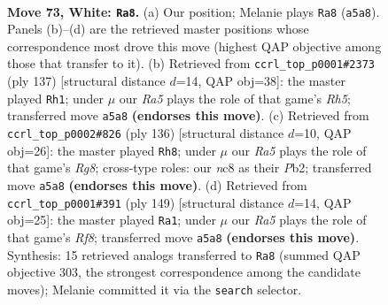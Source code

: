 \documentclass[11pt]{article}
\begin{document}
\clearpage

\begin{figure}[p]\centering
\begin{subfigure}{0.46\textwidth}\centering
\resizebox{\linewidth}{!}{%
\newchessgame
\chessboard[
  setfen={2nk4/8/8/R7/p6r/P6p/7K/8 w - - 4 73},
  showmover=false,
  pgfstyle=straightmove, color=movearrow, markmove={a5-a8}
]}
\caption{}
\end{subfigure}\hfill
\begin{subfigure}{0.46\textwidth}\centering
\resizebox{\linewidth}{!}{%
\newchessgame
\chessboard[
  setfen={8/8/4k3/4P1RP/7r/5K2/8/8 b - - 4 69},
  showmover=false,
  pgfstyle=straightmove, color=movearrow, markmove={h4-h1}
]}
\caption{}
\end{subfigure}
\\[4pt]
\begin{subfigure}{0.46\textwidth}\centering
\resizebox{\linewidth}{!}{%
\newchessgame
\chessboard[
  setfen={6R1/3k4/8/1p3rp1/1K6/7P/1P6/8 w - - 4 69},
  showmover=false,
  pgfstyle=straightmove, color=movearrow, markmove={g8-h8}
]}
\caption{}
\end{subfigure}\hfill
\begin{subfigure}{0.46\textwidth}\centering
\resizebox{\linewidth}{!}{%
\newchessgame
\chessboard[
  setfen={8/7k/7P/4KP1R/8/8/8/5r2 b - - 24 75},
  showmover=false,
  pgfstyle=straightmove, color=movearrow, markmove={f1-a1}
]}
\caption{}
\end{subfigure}
\caption{\textbf{Move 73, White: \texttt{Ra8}.} (a) Our position; Melanie plays \texttt{Ra8} (\texttt{a5a8}). Panels (b)--(d) are the retrieved master positions whose correspondence most drove this move (highest QAP objective among those that transfer to it). (b) Retrieved from \texttt{ccrl\_top\_p0001\#2373} (ply 137) [structural distance $d$=14, QAP obj=38]: the master played \texttt{Rh1}; under $\mu$ our \emph{Ra5} plays the role of that game's \emph{Rh5}; transferred move \texttt{a5a8} \textbf{(endorses this move)}. (c) Retrieved from \texttt{ccrl\_top\_p0002\#826} (ply 136) [structural distance $d$=10, QAP obj=26]: the master played \texttt{Rh8}; under $\mu$ our \emph{Ra5} plays the role of that game's \emph{Rg8}; cross-type roles: our \emph{n}c8 as their \emph{P}b2; transferred move \texttt{a5a8} \textbf{(endorses this move)}. (d) Retrieved from \texttt{ccrl\_top\_p0001\#391} (ply 149) [structural distance $d$=14, QAP obj=25]: the master played \texttt{Ra1}; under $\mu$ our \emph{Ra5} plays the role of that game's \emph{Rf8}; transferred move \texttt{a5a8} \textbf{(endorses this move)}. Synthesis: 15 retrieved analogs transferred to \texttt{Ra8} (summed QAP objective 303, the strongest correspondence among the candidate moves); Melanie committed it via the \texttt{search} selector.}
\label{fig:thought-m144}
\end{figure}
\end{document}
